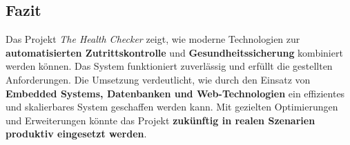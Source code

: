 \subsection{Fazit}

Das Projekt \textit{The Health Checker} zeigt, wie moderne Technologien zur \textbf{automatisierten Zutrittskontrolle} und \textbf{Gesundheitssicherung} kombiniert werden können. Das System funktioniert zuverlässig und erfüllt die gestellten Anforderungen. Die Umsetzung verdeutlicht, wie durch den Einsatz von \textbf{Embedded Systems, Datenbanken und Web-Technologien} ein effizientes und skalierbares System geschaffen werden kann. Mit gezielten Optimierungen und Erweiterungen könnte das Projekt \textbf{zukünftig in realen Szenarien produktiv eingesetzt werden}.
